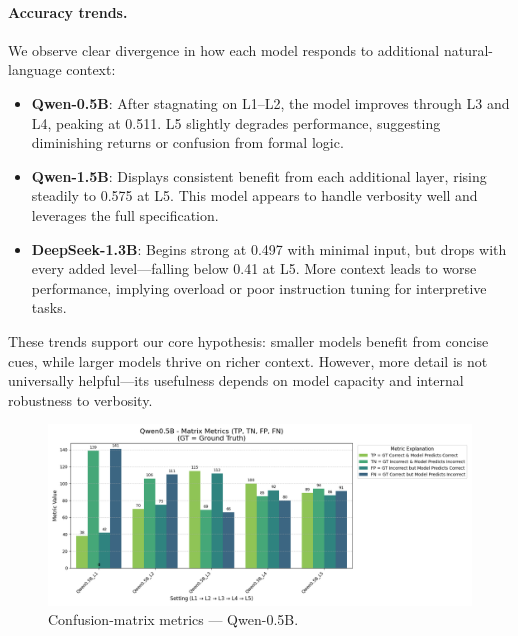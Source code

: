 \documentclass[a4paper]{usiinfbachelorproject}
\begin{document}
\paragraph*{Accuracy trends.}
We observe clear divergence in how each model responds to additional natural-language context:

\begin{itemize}[leftmargin=12pt]
  \item \textbf{Qwen-0.5B}: After stagnating on L1–L2, the model improves through L3 and L4, peaking at 0.511. L5 slightly degrades performance, suggesting diminishing returns or confusion from formal logic.
  
  \item \textbf{Qwen-1.5B}: Displays consistent benefit from each additional layer, rising steadily to 0.575 at L5. This model appears to handle verbosity well and leverages the full specification.

  \item \textbf{DeepSeek-1.3B}: Begins strong at 0.497 with minimal input, but drops with every added level—falling below 0.41 at L5. More context leads to worse performance, implying overload or poor instruction tuning for interpretive tasks.
\end{itemize}

These trends support our core hypothesis: smaller models benefit from concise cues, while larger models thrive on richer context. However, more detail is not universally helpful—its usefulness depends on model capacity and internal robustness to verbosity.

\vspace{0.8em}

\begin{figure}[H]\centering
  \includegraphics[width=\linewidth]{figures/Qwen0.5B_matrix_metrics.png}
  \caption{Confusion-matrix metrics — Qwen-0.5B.}
  \label{fig:q05-matrix}
\end{figure}
\end{document}
